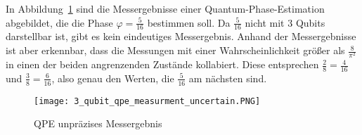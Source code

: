In Abbildung~\ref*{fig:3_qubit_qpe_measurment_uncertain} sind die Messergebnisse einer Quantum-Phase-Estimation abgebildet, 
die die Phase \(\varphi = \frac{5}{16}\) bestimmen soll.
Da \(\frac{5}{16}\) nicht mit 3 Qubits darstellbar ist, 
gibt es kein eindeutiges Messergebnis.
Anhand der Messergebnisse ist aber erkennbar, 
dass die Messungen mit einer Wahrscheinlichkeit größer als \(\frac{8}{\pi^2}\) in
einen der beiden angrenzenden Zustände kollabiert.
Diese entsprechen \({\frac{2}{8} = \frac{4}{16}}\) und \({\frac{3}{8} = \frac{6}{16}}\), 
also genau den Werten, die \(\frac{5}{16}\) am nächsten sind.

\begin{figure}[H]
  \centering
  \texttt{[image: 3\_qubit\_qpe\_measurment\_uncertain.PNG]}
  \caption{QPE unpräzises Messergebnis}
  \label{fig:3_qubit_qpe_measurment_uncertain}
\end{figure}












 






 











